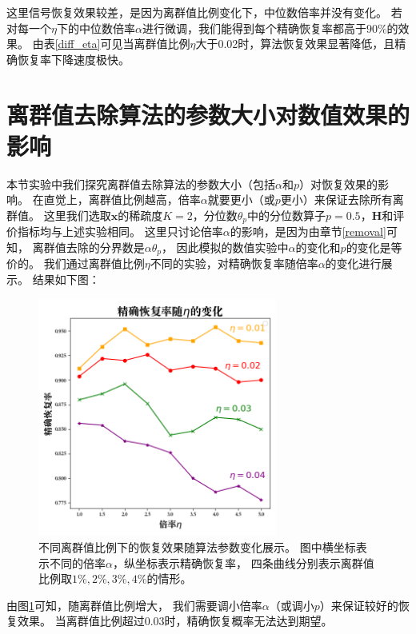 \documentclass[AutoFakeBold]{LZUThesis}
\begin{document}
这里信号恢复效果较差，是因为离群值比例变化下，中位数倍率并没有变化。
若对每一个$\eta$下的中位数倍率$\alpha$进行微调，我们能得到每个精确恢复率都高于$90\%$的效果。
由表\ref{diff_eta}可见当离群值比例$\eta$大于0.02时，算法恢复效果显著降低，且精确恢复率下降速度极快。

\section{离群值去除算法的参数大小对数值效果的影响}
\label{diff_params}
本节实验中我们探究离群值去除算法的参数大小（包括$\alpha$和$p$）对恢复效果的影响。
在直觉上，离群值比例越高，倍率$\alpha$就要更小（或$p$更小）来保证去除所有离群值。
这里我们选取$\mathbf{x}$的稀疏度$K = 2$，分位数$\theta_p$中的分位数算子$p = 0.5$，$\mathbf{H}$和评价指标均与上述实验相同。
这里只讨论倍率$\alpha$的影响，是因为由章节\ref{removal}可知，
离群值去除的分界数是$\alpha \theta_p$，
因此模拟的数值实验中$\alpha$的变化和$p$的变化是等价的。
我们通过离群值比例$\eta$不同的实验，对精确恢复率随倍率$\alpha$的变化进行展示。
结果如下图：
\begin{figure}[H]
    \centering
    \includegraphics[width=0.7\textwidth]{figures/diff_eta.png}
    \caption{不同离群值比例下的恢复效果随算法参数变化展示。
        图中横坐标表示不同的倍率$\alpha$，纵坐标表示精确恢复率，
        四条曲线分别表示离群值比例取$1\%, 2\%, 3\%, 4\%$的情形。
        }
    \label{fig_diff_alg}
\end{figure}

由图\ref{fig_diff_alg}可知，随离群值比例增大，
我们需要调小倍率$\alpha$（或调小$p$）来保证较好的恢复效果。
当离群值比例超过0.03时，精确恢复概率无法达到期望。
\end{document}
